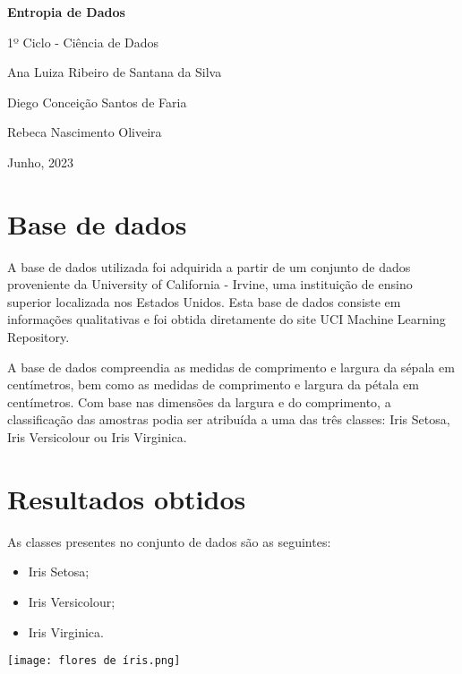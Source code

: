 \documentclass{article}
\begin{document}
\begin{titlepage}

    \centering
    \vspace*{4,8cm}
    \Huge \textbf{Entropia de Dados}

    \vspace{1cm}
    \Large 1º Ciclo - Ciência de Dados
    
    \vspace{0.5cm}
    \Large Ana Luiza Ribeiro de Santana da Silva
    
    \Large Diego Conceição Santos de Faria

    \Large Rebeca Nascimento Oliveira 
    
    \vspace{1cm}
    \Large Junho, 2023
    

\end{titlepage}

\section*{Base de dados}

A base de dados utilizada foi adquirida a partir de um conjunto de dados proveniente da University of California - Irvine, uma instituição de ensino superior localizada nos Estados Unidos. Esta base de dados consiste em informações qualitativas e foi obtida diretamente do site UCI Machine Learning Repository.

A base de dados compreendia as medidas de comprimento e largura da sépala em centímetros, bem como as medidas de comprimento e largura da pétala em centímetros. Com base nas dimensões da largura e do comprimento, a classificação das amostras podia ser atribuída a uma das três classes: Iris Setosa, Iris Versicolour ou Iris Virginica.

\section*{Resultados obtidos}
As classes presentes no conjunto de dados são as seguintes:

\begin{itemize}
    \item Iris Setosa;
    \item Iris Versicolour;
    \item Iris Virginica.
\end{itemize}

\texttt{[image: flores de íris.png]}
\end{document}
